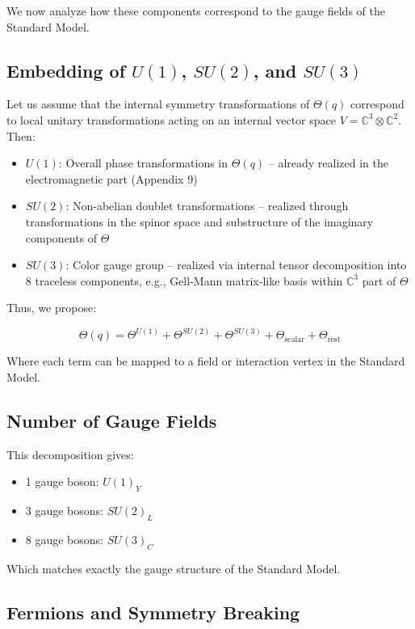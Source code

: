 We now analyze how these components correspond to the gauge fields of the Standard Model.

\subsection*{Embedding of \(U(1)\), \(SU(2)\), and \(SU(3)\)}

Let us assume that the internal symmetry transformations of \(\Theta(q)\) correspond to local unitary transformations
acting on an internal vector space \(V = \mathbb{C}^3 \otimes \mathbb{C}^2\). Then:

\begin{itemize}
  \item \(U(1)\): Overall phase transformations in \(\Theta(q)\) – already realized in the electromagnetic part (Appendix 9)
  \item \(SU(2)\): Non-abelian doublet transformations – realized through transformations in the spinor space and
    substructure of the imaginary components of \(\Theta\)
  \item \(SU(3)\): Color gauge group – realized via internal tensor decomposition into 8 traceless components,
    e.g., Gell-Mann matrix-like basis within \(\mathbb{C}^3\) part of \(\Theta\)
\end{itemize}

Thus, we propose:

\[
\Theta(q) = \Theta^{U(1)} + \Theta^{SU(2)} + \Theta^{SU(3)} + \Theta_{\text{scalar}} + \Theta_{\text{rest}}
\]

Where each term can be mapped to a field or interaction vertex in the Standard Model.

\subsection*{Number of Gauge Fields}

This decomposition gives:
\begin{itemize}
  \item 1 gauge boson: \(U(1)_Y\)
  \item 3 gauge bosons: \(SU(2)_L\)
  \item 8 gauge bosons: \(SU(3)_C\)
\end{itemize}

Which matches exactly the gauge structure of the Standard Model.

\subsection*{Fermions and Symmetry Breaking}

